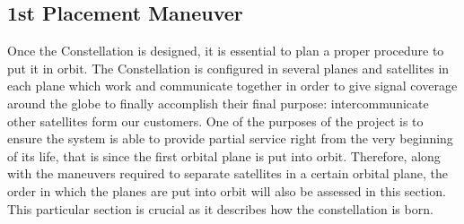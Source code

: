 \subsection{1st Placement Maneuver}
Once the Constellation is designed, it is essential to plan a proper procedure to put it in orbit. The Constellation is configured in several planes and satellites in each plane which work and communicate together in order to give signal coverage around the globe to finally accomplish their final purpose: intercommunicate other satellites form our customers.
\newline\newline
One of the purposes of the project is to ensure the system is able to provide partial service right from the very beginning of its life, that is since the first orbital plane is put into orbit. Therefore, along with the maneuvers required to separate satellites in a certain orbital plane, the order in which the planes are put into orbit will also be assessed in this section. This particular section is crucial as it describes how the constellation is born.
